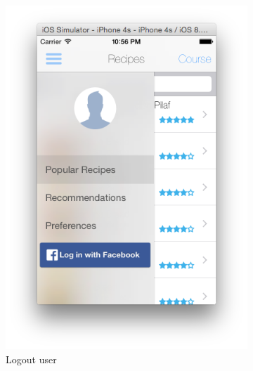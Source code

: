 \begin{figure}[h]
	\begin{subfigure}{.49\textwidth}
		\includegraphics[width=.9\linewidth]{figures/ch4_app_screen_shots/main_menu/main_menu_1.png}
		\caption{Logout user}
	   \label{foodforme_main_menu_screen_logout}
	\end{subfigure}
	\begin{subfigure}{.49\textwidth}

\end{subfigure}
\end{figure}

